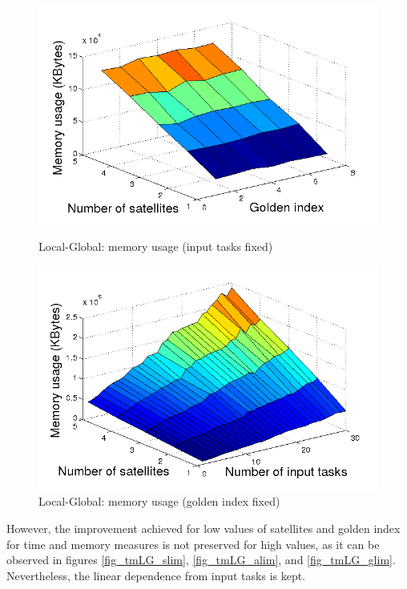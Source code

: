 \begin{figure}[h!]
  \begin{minipage}[b]{0.5\linewidth}
    \includegraphics[width=\linewidth]{Figures/mLG_tasksfix.png}
    \caption{Local-Global: memory usage (input tasks fixed)}\label{fig_mLG_tasksfix}
  \end{minipage}  
  \begin{minipage}[b]{0.5\linewidth}
    \includegraphics[width=\linewidth]{Figures/mLG_goldenfix.png}
    \caption{Local-Global: memory usage (golden index fixed)}\label{fig_mLG_goldenfix}
  \end{minipage}
  \hfill
\end{figure}

However, the improvement achieved for low values of satellites and golden index for time and memory measures is not preserved for high values, as it can be observed in figures \ref{fig_tmLG_slim}, \ref{fig_tmLG_alim}, and \ref{fig_tmLG_glim}. Nevertheless, the linear dependence from input tasks is kept.

